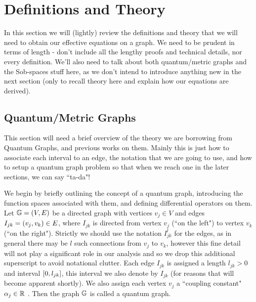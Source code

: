 \section{Definitions and Theory} \label{sec:Heuristics}

In this section we will (lightly) review the definitions and theory that we will need to obtain our effective equations on a graph.
We need to be prudent in terms of length - don't include all the lengthy proofs and technical details, nor every definition.
We'll also need to talk about both quantum/metric graphs and the Sob-spaces stuff here, as we don't intend to introduce anything new in the next section (only to recall theory here and explain how our equations are derived).

\subsection{Quantum/Metric Graphs} \label{ssec:QuantumGraphs}
This section will need a brief overview of the theory we are borrowing from Quantum Graphs, and previous works on them.
Mainly this is just how to associate each interval to an edge, the notation that we are going to use, and how to setup a quantum graph problem so that when we reach one in the later sections, we can say ``ta-da"!

We begin by briefly outlining the concept of a quantum graph, introducing the function spaces associated with them, and defining differential operators on them.
Let $\mathbb{G}=\left( V,E \right)$ be a directed graph with vertices $v_j\in V$ and edges $I_{jk}=\left( v_j, v_k \right)\in E$, where $I_{jk}$ is directed from vertex $v_j$ (``on the left") to vertex $v_k$ (``on the right").
Strictly we should use the notation $I_{jk}^l$ for the edges, as in general there may be $l$ such connections from $v_j$ to $v_k$, however this fine detail will not play a significant role in our analysis and so we drop this additional superscript to avoid notational clutter.
Each edge $I_{jk}$ is assigned a length $l_{jk}>0$ and interval $\left[ 0,l_{jk} \right]$, this interval we also denote by $I_{jk}$ (for reasons that will become apparent shortly).
We also assign each vertex $v_j$ a ``coupling constant" $\alpha_j\in\mathbb{R}$ .
Then the graph $\mathbb{G}$ is called a quantum graph. \newline


